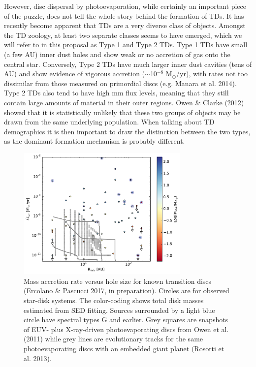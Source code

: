 \documentclass[12pt]{article}
\begin{document}
However, disc dispersal by photoevaporation, while certainly an important piece of the
puzzle, does not tell the whole story behind the formation of TDs. It
has recently become apparent that TDs are a very diverse
class of objects. 
Amongst the TD zoology, at least two separate classes seems
to have emerged, which we will refer to in this proposal as Type 1 and
Type 2 TDs. Type 1 TDs have small (a few AU) inner dust holes and show weak or no accretion of
gas onto the central star. Conversely, Type
2 TDs have much larger inner dust cavities (tens of AU) and show evidence of vigorous accretion ($\sim$10$^{-8}$
M$_{\odot}$/yr), with rates not too dissimilar from those measured
on primordial discs (e.g. Manara et al. 2014). Type 2 TDs also tend to have high mm flux levels, meaning that
they still contain large amounts of material in their outer
regions. Owen \& Clarke (2012) showed that it is statistically
unlikely that these two groups of objects may be drawn from the same
underlying population. When talking about TD demographics it is then
important to draw the distinction between the two types, as the
dominant formation mechanism is probably different.  

\begin{figure}
\centerline{\includegraphics[width=0.75\textwidth]{Macc_Rhole_Mdisk.pdf}}
\caption{Mass accretion rate versus hole size for known transition
  discs (Ercolano \& Pascucci 2017, in preparation). Circles are for
  observed star-disk systems. The color-coding shows total disk masses
  estimated from SED fitting. Sources surrounded by a
  light blue circle have spectral types G and earlier. Grey squares
  are snapshots of EUV- plus X-ray-driven photoevaporating discs from
  Owen et al. (2011) while grey lines are evolutionary tracks for the
  same photoevaporating discs with an embedded giant planet (Rosotti 
  et al. 2013).} 
\end{figure}
\end{document}
